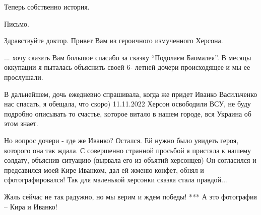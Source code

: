 Теперь собственно история.

Письмо.

Здравствуйте доктор. Привет Вам из героичного измученного Херсона.

... хочу сказать Вам большое спасибо за сказку \enquote{Подолаєм  Баомалея}. В месяцы
оккупации я пыталась объяснить своей 6- летней дочери происходящее и мы ее
прослушали.

В дальнейшем, дочь ежедневно спрашивала, когда же придет Иванко Васильченко нас
спасать, я обещала, что скоро) 11.11.2022 Херсон освободили ВСУ, не буду
подробно описывать то счастье, которое витало в нашем городе, вся Украина об
этом знает. 

Но вопрос дочери  - где же Иванко? Остался. Ей нужно было увидеть героя,
которого она так ждала. С совершенно странной просьбой я пристала к нашему
солдату, объяснив ситуацию (вырвала его из объятий херсонцев) Он согласился и
предсавился моей Кире Иванком, дал ей жменю конфет, обнял и сфотографировался!
Так для маленькой херсонки сказка стала правдой...

Жаль сейчас не так радужно, но мы верим и ждем победы!  *** А это фотография –
Кира и Иванко!
